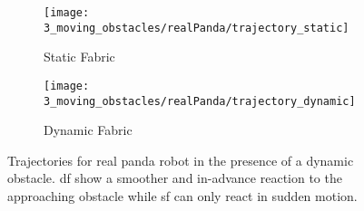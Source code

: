\begin{figure}[h]
  \centering
  \begin{subfigure}{0.5\linewidth}
    \centering
    \texttt{[image: 3\_moving\_obstacles/realPanda/trajectory\_static]}
    \caption{Static Fabric}%
    \label{subfig:experiment3_realPanda_trajectory_static}
  \end{subfigure}%
  \begin{subfigure}{0.5\linewidth}
    \centering
    \texttt{[image: 3\_moving\_obstacles/realPanda/trajectory\_dynamic]}
    \caption{Dynamic Fabric}%
    \label{subfig:experiment3_realPanda_trajectory_dynamic}
  \end{subfigure}
  \caption{Trajectories for real panda robot in the presence of a dynamic obstacle. \ac{df}
    show a smoother and in-advance reaction to the approaching obstacle
    while \ac{sf} can only react in sudden motion.
  }%
  \label{fig:experiment3_realPanda_example}
\end{figure}

\iffalse%
\MS{Takeaway Experiment3: Only dynamic fabrics are able to respect dynamic obstacles.}
\fi


